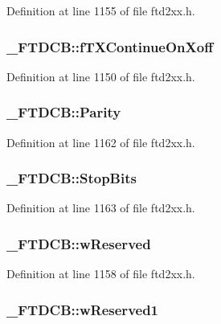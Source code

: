 Definition at line 1155 of file ftd2xx.h.\hypertarget{struct__FTDCB_afa27d3f28cd9154df261cd643df33497}{
\subsubsection[{fTXContinueOnXoff}]{ {\bf \_\-FTDCB::fTXContinueOnXoff}}}
\label{struct__FTDCB_afa27d3f28cd9154df261cd643df33497}


Definition at line 1150 of file ftd2xx.h.\hypertarget{struct__FTDCB_aecaa6eb87d7725f655138a6a6c04c436}{
\subsubsection[{Parity}]{ {\bf \_\-FTDCB::Parity}}}
\label{struct__FTDCB_aecaa6eb87d7725f655138a6a6c04c436}


Definition at line 1162 of file ftd2xx.h.\hypertarget{struct__FTDCB_a26a8414df8e94f282714833f9776319a}{
\subsubsection[{StopBits}]{ {\bf \_\-FTDCB::StopBits}}}
\label{struct__FTDCB_a26a8414df8e94f282714833f9776319a}


Definition at line 1163 of file ftd2xx.h.\hypertarget{struct__FTDCB_a09597c9223026be01c71a1374715fb2f}{
\subsubsection[{wReserved}]{ {\bf \_\-FTDCB::wReserved}}}
\label{struct__FTDCB_a09597c9223026be01c71a1374715fb2f}


Definition at line 1158 of file ftd2xx.h.\hypertarget{struct__FTDCB_a6775b20a593cc63edde243ed9605a028}{
\subsubsection[{wReserved1}]{ {\bf \_\-FTDCB::wReserved1}}}
\label{struct__FTDCB_a6775b20a593cc63edde243ed9605a028}


